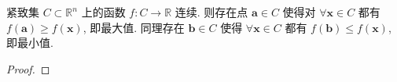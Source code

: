 \documentclass[UTF8]{ctexart}
\newcommand{\ve}[1]{\boldsymbol{\mathbf{#1}}}
\newcommand{\R}{\mathbb R}
\begin{document}
\begin{theorem}
    紧致集 $ C \subset \R^n $ 上的函数 $ f : C \to \R $ 连续. 则存在点 $ \ve a \in C $ 使得对 $ \forall \ve x \in C $ 都有 $ f(\ve a) \geqslant f(\ve x) $, 即最大值. 同理存在 $ \ve b \in C $ 使得 $ \forall \ve x \in C $ 都有 $ f(\ve b) \leqslant f(\ve x) $, 即最小值.
\end{theorem}

\begin{proof}
    
\end{proof}
\end{document}
